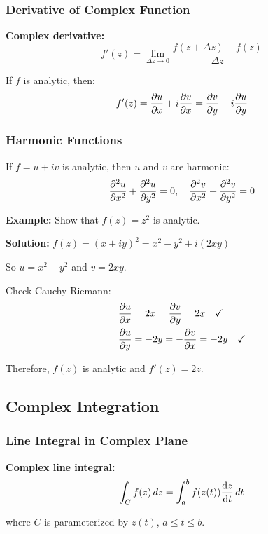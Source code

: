 \documentclass[12pt,a4paper]{article}
\begin{document}
\subsubsection{Derivative of Complex Function}
\begin{formulabox}
\textbf{Complex derivative:}
\begin{equation}
f'(z) = \lim_{\Delta z \to 0} \frac{f(z + \Delta z) - f(z)}{\Delta z}
\end{equation}

If $f$ is analytic, then:
\begin{equation}
f'(z) = \pdv{u}{x} + i\pdv{v}{x} = \pdv{v}{y} - i\pdv{u}{y}
\end{equation}
\end{formulabox}

\subsubsection{Harmonic Functions}
If $f = u + iv$ is analytic, then $u$ and $v$ are harmonic:
\begin{equation}
\pdv[2]{u}{x} + \pdv[2]{u}{y} = 0, \quad \pdv[2]{v}{x} + \pdv[2]{v}{y} = 0
\end{equation}

\begin{examplebox}
\textbf{Example:} Show that $f(z) = z^2$ is analytic.

\textbf{Solution:} $f(z) = (x + iy)^2 = x^2 - y^2 + i(2xy)$

So $u = x^2 - y^2$ and $v = 2xy$.

Check Cauchy-Riemann:
\begin{align}
\pdv{u}{x} &= 2x = \pdv{v}{y} = 2x \quad \checkmark \\
\pdv{u}{y} &= -2y = -\pdv{v}{x} = -2y \quad \checkmark
\end{align}

Therefore, $f(z)$ is analytic and $f'(z) = 2z$.
\end{examplebox}

\subsection{Complex Integration}
\subsubsection{Line Integral in Complex Plane}
\begin{formulabox}
\textbf{Complex line integral:}
\begin{equation}
\int_C f(z) \, dz = \int_a^b f(z(t)) \dv{z}{t} \, dt
\end{equation}

where $C$ is parameterized by $z(t)$, $a \leq t \leq b$.
\end{formulabox}
\end{document}
